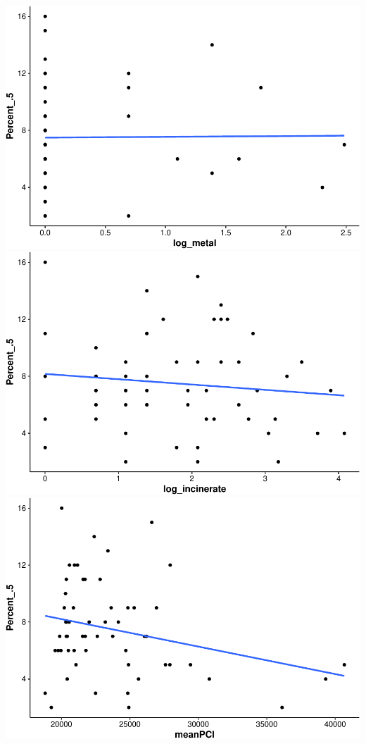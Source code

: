 \documentclass[
  12pt,
]{article}
\begin{document}
\includegraphics{Alcorn_Bao_Hermanson_ENV872_Project_files/figure-latex/linear plotssss -1.pdf}
\includegraphics{Alcorn_Bao_Hermanson_ENV872_Project_files/figure-latex/linear plotssss -2.pdf}
\includegraphics{Alcorn_Bao_Hermanson_ENV872_Project_files/figure-latex/linear plotssss -3.pdf}
\end{document}

